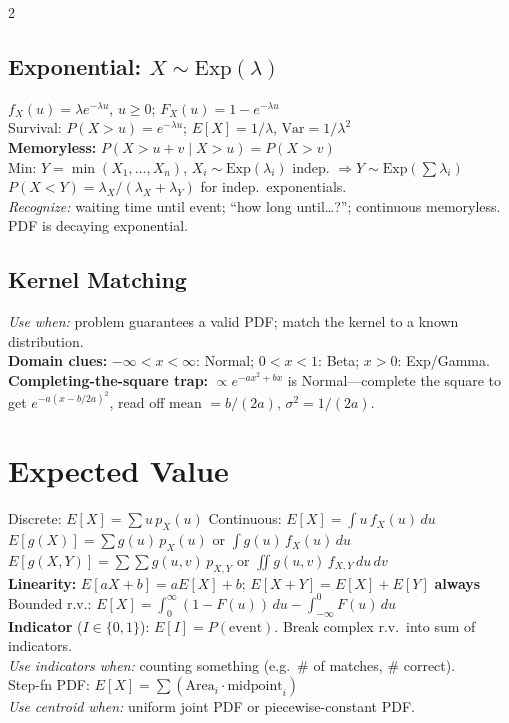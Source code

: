 \documentclass[10pt]{article}
\begin{document}
\begin{multicols*}{2}
\subsection{Exponential: $X \sim \text{Exp}(\lambda)$}
$f_X(u) = \lambda e^{-\lambda u}$, $u \ge 0$;\;\; $F_X(u) = 1 - e^{-\lambda u}$ \\
Survival: $P(X > u) = e^{-\lambda u}$;\;\; $E[X] = 1/\lambda$,\; $\text{Var} = 1/\lambda^2$ \\
\textbf{Memoryless:} $P(X > u+v \mid X > u) = P(X > v)$ \\
Min: $Y = \min(X_1,\ldots,X_n)$, $X_i \sim \text{Exp}(\lambda_i)$ indep. $\Rightarrow Y \sim \text{Exp}(\sum \lambda_i)$ \\
$P(X < Y) = \lambda_X/(\lambda_X + \lambda_Y)$ for indep.\ exponentials. \\
\textit{Recognize:} waiting time until event; ``how long until\ldots ?''; continuous memoryless. PDF is decaying exponential.

\subsection{Kernel Matching}
\textit{Use when:} problem guarantees a valid PDF; match the kernel to a known distribution. \\
\textbf{Domain clues:} $-\infty < x < \infty$: Normal;\; $0<x<1$: Beta;\; $x>0$: Exp/Gamma. \\
\textbf{Completing-the-square trap:} $\propto e^{-ax^2+bx}$ is Normal---complete the square to get $e^{-a(x-b/2a)^2}$, read off mean $= b/(2a)$, $\sigma^2 = 1/(2a)$.

\section{Expected Value}
Discrete: $E[X] = \sum u\, p_X(u)$ \quad Continuous: $E[X] = \int u\, f_X(u)\,du$ \\
$E[g(X)] = \sum g(u)\,p_X(u)$ or $\int g(u)\,f_X(u)\,du$ \\
$E[g(X,Y)] = \sum\sum g(u,v)\, p_{X,Y}$ or $\iint g(u,v)\, f_{X,Y}\,du\,dv$ \\
\textbf{Linearity:} $E[aX+b] = aE[X]+b$;\; $E[X+Y] = E[X] + E[Y]$ \textbf{always} \\
Bounded r.v.: $E[X] = \int_0^{\infty}\!(1-F(u))\,du - \int_{-\infty}^{0}\! F(u)\,du$ \\
\textbf{Indicator} ($I \in \{0,1\}$): $E[I] = P(\text{event})$. Break complex r.v.\ into sum of indicators. \\
\textit{Use indicators when:} counting something (e.g.\ \# of matches, \# correct). \\
Step-fn PDF: $E[X] = \sum(\text{Area}_i \cdot \text{midpoint}_i)$ \\
\textit{Use centroid when:} uniform joint PDF or piecewise-constant PDF.


\end{multicols*}
\end{document}
